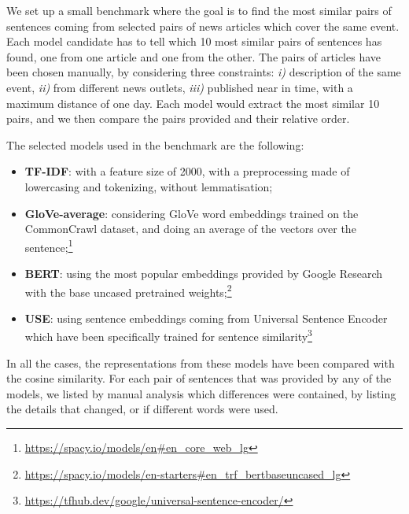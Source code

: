 We set up a small benchmark where the goal is to find the most similar pairs of sentences coming from selected pairs of news articles which cover the same event. Each model candidate has to tell which 10 most similar pairs of sentences has found, one from one article and one from the other.
The pairs of articles have been chosen manually, by considering three constraints: \textit{i)} description of the same event, \textit{ii)} from different news outlets, \textit{iii)} published near in time, with a maximum distance of one day.
Each model would extract the most similar 10 pairs, and we then compare the pairs provided and their relative order.

The selected models used in the benchmark are the following:
\begin{itemize}
    \item \textbf{TF-IDF}: with a feature size of 2000, with a preprocessing made of lowercasing and tokenizing, without lemmatisation;
    \item \textbf{GloVe-average}: considering GloVe word embeddings trained on the CommonCrawl dataset, and doing an average of the vectors over the sentence;\footnote{\url{https://spacy.io/models/en\#en_core_web_lg}}
    \item \textbf{BERT}: using the most popular embeddings provided by Google Research~\cite{devlin2018bert} with the base uncased pretrained weights;\footnote{\url{https://spacy.io/models/en-starters\#en_trf_bertbaseuncased_lg}}
    \item \textbf{USE}: using sentence embeddings coming from Universal Sentence Encoder~\cite{cer2018universal} which have been specifically trained for sentence similarity\footnote{\url{https://tfhub.dev/google/universal-sentence-encoder/}}
\end{itemize}

In all the cases, the representations from these models have been compared with the cosine similarity.
For each pair of sentences that was provided by any of the models, we listed by manual analysis which differences were contained, by listing the details that changed, or if different words were used.


